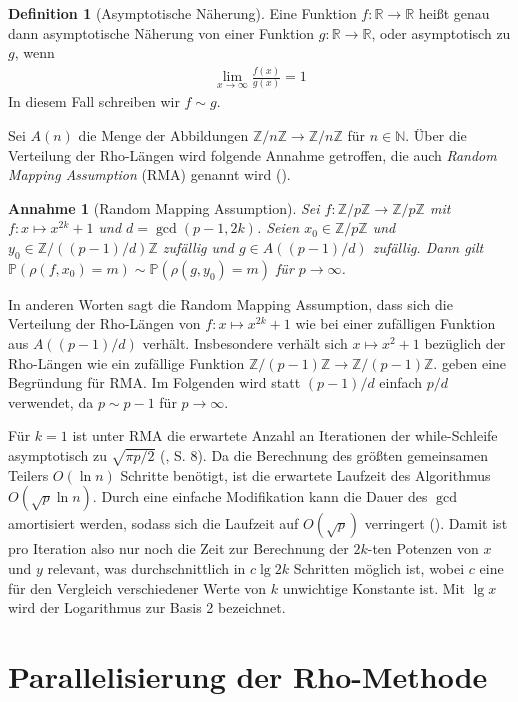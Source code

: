 \documentclass[a4paper, 11pt, ngerman]{article}
\newcommand{\N}{\mathbb{N}}
\newcommand{\R}{\mathbb{R}}
\newcommand{\Z}{\mathbb{Z}}
\renewcommand{\P}{\mathbb{P}}
\theoremstyle{definition}
\newtheorem{definition}{Definition}
\theoremstyle{plain}
\newtheorem*{assumption*}{Annahme}
\theoremstyle{remark}
\begin{document}
\begin{definition}[Asymptotische Näherung]
    Eine Funktion $f : \R \to \R$ heißt genau dann asymptotische Näherung von einer Funktion $g : \R \to \R$, oder asymptotisch zu $g$, wenn
    \begin{align*}
        \lim_{x \to \infty} \frac {f(x)} {g(x)} = 1
    \end{align*}
    In diesem Fall schreiben wir $f \sim g$.
\end{definition}

\noindent Sei $A(n)$ die Menge der Abbildungen $\Z/n\Z \to \Z/n\Z$ für $n \in \N$. Über die Verteilung der Rho-Längen wird folgende Annahme getroffen, die auch \emph{Random Mapping Assumption} (RMA) genannt wird (\cite{bp81}).

\begin{assumption*}[Random Mapping Assumption]
    Sei $f: \Z/p\Z \to \Z/p\Z$ mit $f : x \mapsto x^{2k} + 1$ und $d = \gcd(p - 1, 2k)$. Seien $x_0 \in \Z/p\Z$ und $y_0 \in \Z/((p - 1)/d)\Z$ zufällig und $g \in A((p - 1)/d)$ zufällig. Dann gilt $\P(\rho(f, x_0) = m) \sim \P(\rho(g, y_0) = m)$ für $p \to \infty$.
\end{assumption*}

\noindent In anderen Worten sagt die Random Mapping Assumption, dass sich die Verteilung der Rho-Längen von $f : x \mapsto x^{2k} + 1$ wie bei einer zufälligen Funktion aus $A((p - 1)/d)$ verhält. Insbesondere verhält sich $x \mapsto x^2 + 1$ bezüglich der Rho-Längen wie ein zufällige Funktion $\Z/(p - 1)\Z \to \Z/(p - 1)\Z$. \cite{bp81} geben eine Begründung für RMA. Im Folgenden wird statt $(p - 1)/d$ einfach $p/d$ verwendet, da $p \sim p - 1$ für $p \to \infty$.

Für $k = 1$ ist unter RMA die erwartete Anzahl an Iterationen der while-Schleife asymptotisch zu $\sqrt{\pi p / 2}$ (\cite{knu98}, S. 8). Da die Berechnung des größten gemeinsamen Teilers $O(\ln n)$ Schritte benötigt, ist die erwartete Laufzeit des Algorithmus $O(\sqrt p \ln n)$. Durch eine einfache Modifikation kann die Dauer des $\gcd$ amortisiert werden, sodass sich die Laufzeit auf $O(\sqrt p)$ verringert (\cite{bre80}). Damit ist pro Iteration also nur noch die Zeit zur Berechnung der $2k$-ten Potenzen von $x$ und $y$ relevant, was durchschnittlich in $c \lg 2k$ Schritten möglich ist, wobei $c$ eine für den Vergleich verschiedener Werte von $k$ unwichtige Konstante ist. Mit $\lg x$ wird der Logarithmus zur Basis 2 bezeichnet.

\section{Parallelisierung der Rho-Methode}
\label{sec:rho-parallelization}
\end{document}
